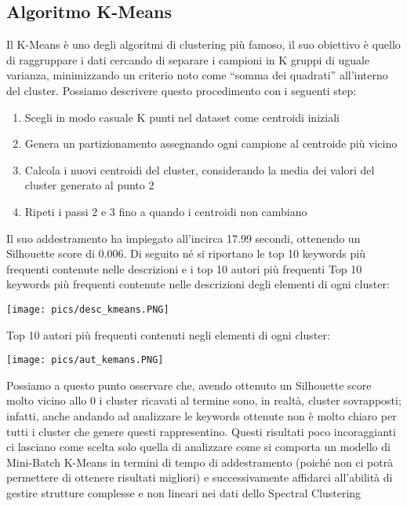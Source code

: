 \documentclass[12pt,oneside]{article}
\begin{document}
    \begin{enumerate}
    \subsection{Algoritmo K-Means}
    \begin{justify}
        Il K-Means è uno degli algoritmi di clustering più famoso, il suo obiettivo è quello di raggruppare i dati cercando di separare i campioni in K gruppi di uguale varianza, minimizzando un criterio noto come “somma dei quadrati” all'interno del cluster. Possiamo descrivere questo procedimento con i seguenti step:
        \begin{enumerate}[label=\arabic*)]
            \item Scegli in modo casuale K punti nel dataset come centroidi iniziali
            \item Genera un partizionamento assegnando ogni campione al centroide più vicino
            \item Calcola i nuovi centroidi del cluster, considerando la media dei valori del cluster generato al punto 2
            \item Ripeti i passi 2 e 3 fino a quando i centroidi non cambiano
        \end{enumerate}
        Il suo addestramento ha impiegato all’incirca 17.99 secondi, ottenendo un Silhouette score di 0.006. Di seguito né si riportano le top 10 keywords più frequenti contenute nelle descrizioni e i top 10 autori più frequenti
        Top 10 keywords più frequenti contenute nelle descrizioni degli elementi di ogni cluster:
        \end{justify}

        \texttt{[image: pics/desc\_kmeans.PNG]}
        
        \begin{justify}
        Top 10 autori più frequenti contenuti negli elementi di ogni cluster:
        \end{justify}

        \texttt{[image: pics/aut\_kemans.PNG]}
        
        \begin{justify}
        Possiamo a questo punto osservare che, avendo ottenuto un Silhouette score molto vicino allo 0 i cluster ricavati al termine sono, in realtà, cluster sovrapposti; infatti, anche andando ad analizzare le keywords ottenute non è molto chiaro per tutti i cluster che genere questi rappresentino. Questi risultati poco incoraggianti ci lasciano come scelta solo quella di analizzare come si comporta un modello di Mini-Batch K-Means in termini di tempo di addestramento (poiché non ci potrà permettere di ottenere risultati migliori) e successivamente affidarci all’abilità di gestire strutture complesse e non lineari nei dati dello Spectral Clustering
    \end{justify}
    \end{enumerate}
\end{document}
